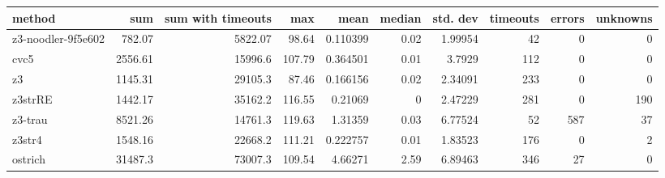 \begin{tabular}{lrrrrrrrrr}
\hline
 method             &      sum &   sum with timeouts &    max &     mean &   median &   std. dev &   timeouts &   errors &   unknowns \\
\hline
 z3-noodler-9f5e602 &   782.07 &             5822.07 &  98.64 & 0.110399 &     0.02 &    1.99954 &         42 &        0 &          0 \\
 cvc5               &  2556.61 &            15996.6  & 107.79 & 0.364501 &     0.01 &    3.7929  &        112 &        0 &          0 \\
 z3                 &  1145.31 &            29105.3  &  87.46 & 0.166156 &     0.02 &    2.34091 &        233 &        0 &          0 \\
 z3strRE            &  1442.17 &            35162.2  & 116.55 & 0.21069  &     0    &    2.47229 &        281 &        0 &        190 \\
 z3-trau            &  8521.26 &            14761.3  & 119.63 & 1.31359  &     0.03 &    6.77524 &         52 &      587 &         37 \\
 z3str4             &  1548.16 &            22668.2  & 111.21 & 0.222757 &     0.01 &    1.83523 &        176 &        0 &          2 \\
 ostrich            & 31487.3  &            73007.3  & 109.54 & 4.66271  &     2.59 &    6.89463 &        346 &       27 &          0 \\
\hline
\end{tabular}
